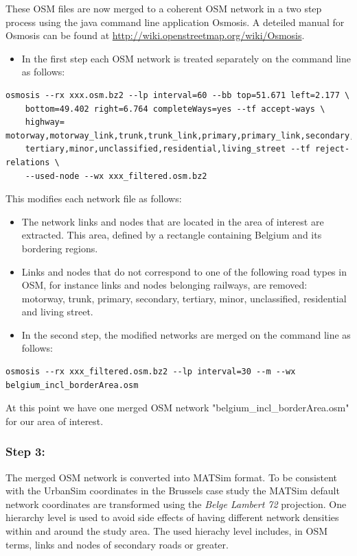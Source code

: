 These OSM files are now merged to a coherent OSM network in a two  step process using the java command line application Osmosis. A deteiled  manual for Osmosis can be found at \href{http://wiki.openstreetmap.org/wiki/Osmosis}{http://wiki.openstreetmap.org/wiki/Osmosis}.
\begin{itemize}
	\item In the first step each OSM network is treated separately on the command line as follows:
\end{itemize}
\begin{verbatim}
osmosis --rx xxx.osm.bz2 --lp interval=60 --bb top=51.671 left=2.177 \
    bottom=49.402 right=6.764 completeWays=yes --tf accept-ways \
    highway= motorway,motorway_link,trunk,trunk_link,primary,primary_link,secondary,\
    tertiary,minor,unclassified,residential,living_street --tf reject-relations \
    --used-node --wx xxx_filtered.osm.bz2
\end{verbatim}

This modifies each network file as follows:
\begin{itemize}
	\item The network links and nodes that are  located in the area of interest are extracted. This area, defined by a  rectangle containing Belgium and its bordering regions.
	\item Links and nodes that do not correspond  to one of the following road types in OSM, for instance links and nodes  belonging railways, are removed: motorway, trunk, primary, secondary,  tertiary, minor, unclassified, residential and living street.
\end{itemize}
\begin{itemize}
	\item In the second step, the modified networks are merged on the command line as follows:
\end{itemize}
\begin{verbatim}
osmosis --rx xxx_filtered.osm.bz2 --lp interval=30 --m --wx belgium_incl_borderArea.osm
\end{verbatim}

At this point we have one merged OSM network "belgium\_incl\_borderArea.osm" for our area of interest.

\subsubsection{Step 3:}

The merged OSM network is converted into MATSim format. To be  consistent with the UrbanSim coordinates in the Brussels case study the  MATSim default network coordinates are transformed using the \emph{Belge Lambert 72}  projection. One hierarchy level is used to avoid side effects of having  different network densities within and around the study area. The used  hierachy level includes, in OSM terms, links and nodes of secondary  roads or greater.

